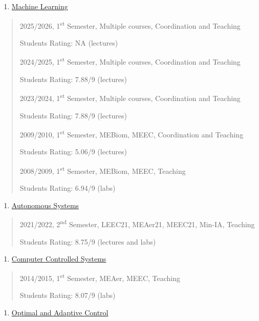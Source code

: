 \begin{enumerate}
\def\labelenumi{\arabic{enumi}.}
\setcounter{enumi}{3}
\item
  \ul{Machine Learning}
\end{enumerate}

\begin{quote}
2025/2026, 1\textsuperscript{st} Semester, Multiple courses,
Coordination and Teaching

Students Rating: NA (lectures)

2024/2025, 1\textsuperscript{st} Semester, Multiple courses,
Coordination and Teaching

Students Rating: 7.88/9 (lectures)

2023/2024, 1\textsuperscript{st} Semester, Multiple courses,
Coordination and Teaching

Students Rating: 7.88/9 (lectures)

2009/2010, 1\textsuperscript{st} Semester, MEBiom, MEEC, Coordination
and Teaching

Students Rating: 5.06/9 (lectures)

2008/2009, 1\textsuperscript{st} Semester, MEBiom, MEEC, Teaching

Students Rating: 6.94/9 (labs)
\end{quote}

\begin{enumerate}
\def\labelenumi{\arabic{enumi}.}
\setcounter{enumi}{4}
\item
  \ul{Autonomous Systems}
\end{enumerate}

\begin{quote}
2021/2022, 2\textsuperscript{nd} Semester, LEEC21, MEAer21, MEEC21,
Min-IA, Teaching

Students Rating: 8.75/9 (lectures and labs)
\end{quote}

\begin{enumerate}
\def\labelenumi{\arabic{enumi}.}
\setcounter{enumi}{5}
\item
  \ul{Computer Controlled Systems}
\end{enumerate}

\begin{quote}
2014/2015, 1\textsuperscript{st} Semester, MEAer, MEEC, Teaching

Students Rating: 8.07/9 (labs)
\end{quote}

\begin{enumerate}
\def\labelenumi{\arabic{enumi}.}
\setcounter{enumi}{6}
\item
  \ul{Optimal and Adaptive Control}
\end{enumerate}

